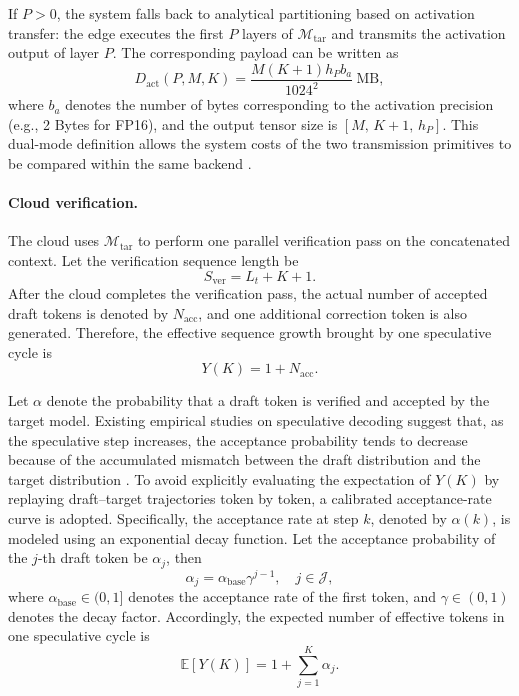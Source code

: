 \documentclass[a4paper,fleqn]{cas-dc}
\begin{document}
If $P > 0$, the system falls back to analytical partitioning based on activation transfer: the edge executes the first $P$ layers of $\mathcal{M}_{\mathrm{tar}}$ and transmits the activation output of layer $P$. The corresponding payload can be written as
\begin{equation}
D_{\text{act}}(P,M,K) = \frac{M(K+1)h_P b_a}{1024^2}\ \text{MB},
\end{equation}
where $b_a$ denotes the number of bytes corresponding to the activation precision (e.g., 2 Bytes for FP16), and the output tensor size is $[M,\,K+1,\,h_P]$. This dual-mode definition allows the system costs of the two transmission primitives to be compared within the same backend \cite{kang2017neurosurgeon,patel2024splitwise,mudvari2024splitllm,chen2025adaptivelayersplitting}.

\paragraph{Cloud verification.}
The cloud uses $\mathcal{M}_{\mathrm{tar}}$ to perform one parallel verification pass on the concatenated context. Let the verification sequence length be
\begin{equation}
S_{\text{ver}} = L_t + K + 1.
\end{equation}
After the cloud completes the verification pass, the actual number of accepted draft tokens is denoted by $N_{\text{acc}}$, and one additional correction token is also generated. Therefore, the effective sequence growth brought by one speculative cycle is
\begin{equation}
Y(K) = 1 + N_{\text{acc}}.
\end{equation}

Let $\alpha$ denote the probability that a draft token is verified and accepted by the target model. Existing empirical studies on speculative decoding suggest that, as the speculative step increases, the acceptance probability tends to decrease because of the accumulated mismatch between the draft distribution and the target distribution \cite{leviathan2023speculative,li2024eagle}. To avoid explicitly evaluating the expectation of $Y(K)$ by replaying draft--target trajectories token by token, a calibrated acceptance-rate curve is adopted. Specifically, the acceptance rate at step $k$, denoted by $\alpha(k)$, is modeled using an exponential decay function. Let the acceptance probability of the $j$-th draft token be $\alpha_j$, then
\begin{equation}
\alpha_j = \alpha_{\text{base}} \gamma^{j-1}, \quad j\in\mathcal{J},
\end{equation}
where $\alpha_{\text{base}} \in (0,1]$ denotes the acceptance rate of the first token, and $\gamma \in (0,1)$ denotes the decay factor. Accordingly, the expected number of effective tokens in one speculative cycle is
\begin{equation}
\mathbb{E}[Y(K)] = 1 + \sum_{j=1}^{K} \alpha_j.
\end{equation}
\end{document}
